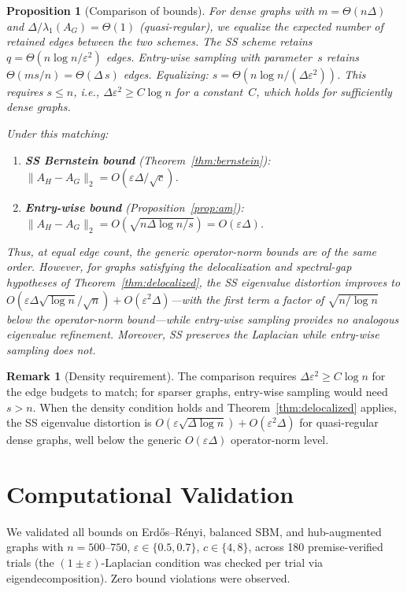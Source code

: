 \documentclass[11pt]{article}
\newtheorem{proposition}[theorem]{Proposition}
\theoremstyle{definition}
\newtheorem{remark}[theorem]{Remark}
\newcommand{\eps}{\varepsilon}
\newcommand{\lamG}{\lambda_1(A_G)}
\newcommand{\AG}{A_G}
\newcommand{\AH}{A_H}
\begin{document}
\begin{proposition}[Comparison of bounds]\label{prop:comparison}
For \emph{dense} graphs with $m = \Theta(n\Delta)$ and $\Delta/\lamG = \Theta(1)$
(quasi-regular), we equalize the expected number of retained edges between the two
schemes. The SS scheme retains $q = \Theta(n\log n / \eps^2)$ edges.
Entry-wise sampling with parameter~$s$ retains $\Theta(ms/n) = \Theta(\Delta\,s)$ edges.
Equalizing: $s = \Theta(n\log n/(\Delta\eps^2))$.
This requires $s \leq n$, i.e., $\Delta\eps^2 \geq C\log n$ for a constant~$C$,
which holds for sufficiently dense graphs.

Under this matching:
\begin{enumerate}[label=(\roman*),nosep]
\item \textbf{SS Bernstein bound} (Theorem~\ref{thm:bernstein}):
$\|\AH - \AG\|_2 = O(\eps\Delta/\sqrt{c})$.
\item \textbf{Entry-wise bound} (Proposition~\ref{prop:am}):
$\|\AH - \AG\|_2 = O\!\left(\sqrt{n\Delta\log n / s}\right) = O(\eps\Delta)$.
\end{enumerate}
Thus, at equal edge count, the generic operator-norm bounds are of the same order.
However, for graphs satisfying the delocalization and spectral-gap hypotheses of
Theorem~\ref{thm:delocalized}, the SS \emph{eigenvalue} distortion improves to
$O(\eps\Delta\sqrt{\log n}/\sqrt{n}) + O(\eps^2\Delta)$---with the first term a factor
of $\sqrt{n/\log n}$ below the
operator-norm bound---while entry-wise sampling provides no analogous eigenvalue
refinement. Moreover, SS preserves the Laplacian while entry-wise sampling does not.
\end{proposition}

\begin{remark}[Density requirement]
The comparison requires $\Delta\eps^2 \geq C\log n$ for the edge budgets to match;
for sparser graphs, entry-wise sampling would need $s > n$. When the density condition
holds and Theorem~\ref{thm:delocalized} applies, the SS eigenvalue distortion is
$O(\eps\sqrt{\Delta\log n}) + O(\eps^2\Delta)$ for quasi-regular dense graphs,
well below the generic $O(\eps\Delta)$ operator-norm level.
\end{remark}


\section{Computational Validation}\label{sec:experiments}

We validated all bounds on Erd\H{o}s--R\'{e}nyi, balanced SBM, and hub-augmented
graphs with $n = 500$--$750$, $\eps \in \{0.5, 0.7\}$, $c \in \{4, 8\}$,
across 180 premise-verified trials (the $(1\pm\eps)$-Laplacian condition was checked
per trial via eigendecomposition). Zero bound violations were observed.
\end{document}
